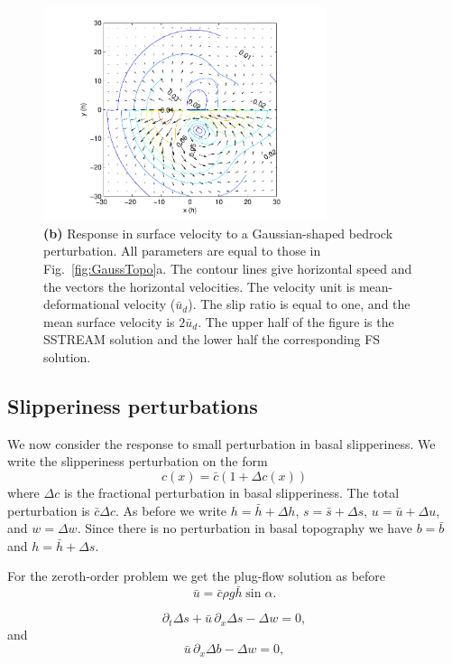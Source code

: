 \documentclass[10pt,a4paper]{book}
\newcommand{\p}{\partial}
\begin{document}
\addtocounter{figure}{-1}
\begin{figure}
\vspace*{2mm}
\centerline{\includegraphics[width=8.3cm]{tc-2007-0016-f13b.pdf}}
\caption{{\bf (b)} Response in surface velocity to a Gaussian-shaped 
bedrock perturbation. All parameters are equal to those in
Fig.~\ref{fig:GaussTopo}a. The contour lines give horizontal speed and
the vectors the horizontal velocities. The velocity unit is
mean-deformational velocity ($\bar{u}_d$). The slip ratio is equal to
one, and the mean surface velocity is $2 \bar{u}_d$. The upper half of
the figure is the SSTREAM solution and the lower half the
corresponding FS solution.
\label{fig:GaussVel}}
\end{figure}


\subsection{Slipperiness perturbations}

We now consider the response to small perturbation in basal
slipperiness.  We write the slipperiness perturbation on the form
\[
c(x)=\bar{c}(1+\Delta c(x))
\]
where $\Delta c$ is the fractional perturbation in basal
slipperiness. The total perturbation is $\bar{c} \Delta c$. As before
we write $h=\bar{h}+\Delta h$, $s=\bar{s}+\Delta s$, $u=\bar{u}+\Delta
u$, and $w=\Delta w$. Since there is no perturbation in basal
topography we have $b=\bar{b}$ and $h=\bar{h}+\Delta s$.

For the zeroth-order problem we get the plug-flow solution as before		
\begin{equation}
\bar{u}=\bar{c} \rho g \bar{h} \sin \alpha  .
\end{equation}	

\begin{equation}
\p_t \Delta s +\bar{u} \, \p_x \Delta s -\Delta w =0 ,
\end{equation}	
and	
\begin{equation}
\bar{u} \, \p_x \Delta b -\Delta w =0 ,
\end{equation}		
\end{document}
